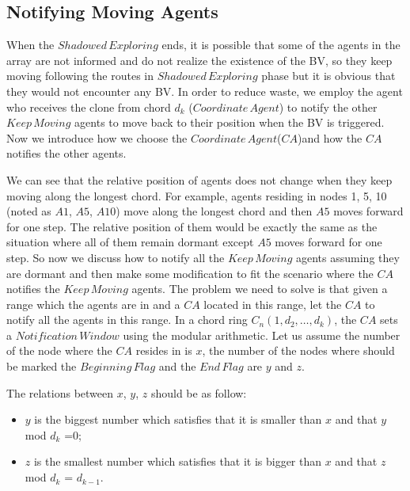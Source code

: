 \documentclass[conference]{IEEEtran}
\begin{document}
\subsection{Notifying Moving Agents}


When the $Shadowed\,Exploring$ ends, it is possible that some of the agents in the array are not informed and do not realize the existence of the BV, so they keep moving following the routes in $Shadowed\,Exploring$  phase but it is obvious that they would not encounter any BV. In order to reduce waste, we employ the agent who receives the clone from chord $d_k$ ($Coordinate\,Agent$) to notify the other $Keep\,Moving$ agents to move back to their position when the BV is triggered. Now we introduce how we choose the $Coordinate\,Agent$($CA$)and how the $CA$ notifies the other agents.\\


We can see that the relative position of agents does not change when they keep moving along the longest chord. For example, agents residing in nodes 1, 5, 10 (noted as $A1$, $A5$, $A10$) move along the longest chord and then $A5$ moves forward for one step. The relative position of them would be exactly the same as the situation where all of them remain dormant except $A5$ moves forward for one step. So now we discuss how to notify all the $Keep\,Moving$ agents assuming they are dormant and then make some modification to fit the scenario where the $CA$ notifies the $Keep\,Moving$ agents. The problem we need to solve is that given a range which the agents are in and a $CA$ located in this range, let the $CA$ to notify all the agents in this range. In a chord ring $C_n(1, d_2, \ldots, d_k)$, the $CA$ sets a $Notification\,Window$ using the modular arithmetic. Let us assume the number of the node where the $CA$ resides in is $x$, the number of the nodes where should be marked the $Beginning\,Flag$ and the $End\,Flag$ are $y$ and $z$. 

The relations between $x$, $y$, $z$ should be as follow: 

\begin{itemize}
\item $y$ is the biggest number which satisfies that it is smaller than $x$ and that $y$ mod $d_k$ =$0$; 
\item $z$ is the smallest number which satisfies that it is bigger than $x$ and that $z$ mod $d_k$ = $d_{k-1}$.
\end{itemize} 
\end{document}
